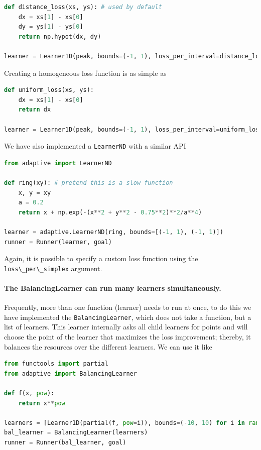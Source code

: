 \documentclass[english, twocolumn, 10pt, aps, superscriptaddress, floatfix, prb, citeautoscript]{revtex4-1}
\newcommand{\passthrough}[1]{\lstset{mathescape=false}#1\lstset{mathescape=true}}
\begin{document}
\begin{lstlisting}[language=Python]
def distance_loss(xs, ys): # used by default
    dx = xs[1] - xs[0]
    dy = ys[1] - ys[0]
    return np.hypot(dx, dy)

learner = Learner1D(peak, bounds=(-1, 1), loss_per_interval=distance_loss)
\end{lstlisting}

Creating a homogeneous loss function is as simple as

\begin{lstlisting}[language=Python]
def uniform_loss(xs, ys):
    dx = xs[1] - xs[0]
    return dx

learner = Learner1D(peak, bounds=(-1, 1), loss_per_interval=uniform_loss)
\end{lstlisting}

We have also implemented a \passthrough{\lstinline!LearnerND!} with a similar API

\begin{lstlisting}[language=Python]
from adaptive import LearnerND

def ring(xy): # pretend this is a slow function
    x, y = xy
    a = 0.2
    return x + np.exp(-(x**2 + y**2 - 0.75**2)**2/a**4)

learner = adaptive.LearnerND(ring, bounds=[(-1, 1), (-1, 1)])
runner = Runner(learner, goal)
\end{lstlisting}

Again, it is possible to specify a custom loss function using the \passthrough{\lstinline!loss\_per\_simplex!} argument.

\paragraph{The BalancingLearner can run many learners simultaneously.}

Frequently, more than one function (learner) needs to run at once, to do this we have implemented the \passthrough{\lstinline!BalancingLearner!}, which does not take a function, but a list of learners.
This learner internally asks all child learners for points and will choose the point of the learner that maximizes the loss improvement; thereby, it balances the resources over the different learners.
We can use it like

\begin{lstlisting}[language=Python]
from functools import partial
from adaptive import BalancingLearner

def f(x, pow):
    return x**pow

learners = [Learner1D(partial(f, pow=i)), bounds=(-10, 10) for i in range(2, 10)]
bal_learner = BalancingLearner(learners)
runner = Runner(bal_learner, goal)
\end{lstlisting}
\end{document}
